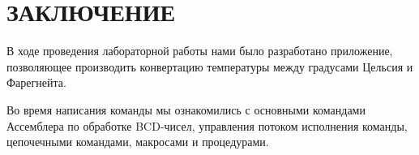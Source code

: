 \section*{ЗАКЛЮЧЕНИЕ}

В ходе проведения лабораторной работы нами было разработано приложение,
позволяющее производить конвертацию температуры между градусами Цельсия и
Фарегнейта.

Во время написания команды мы ознакомились с основными командами Ассемблера по 
обработке BCD-чисел, управления потоком исполнения команды, цепочечными командами,
макросами и процедурами.

\newpage

